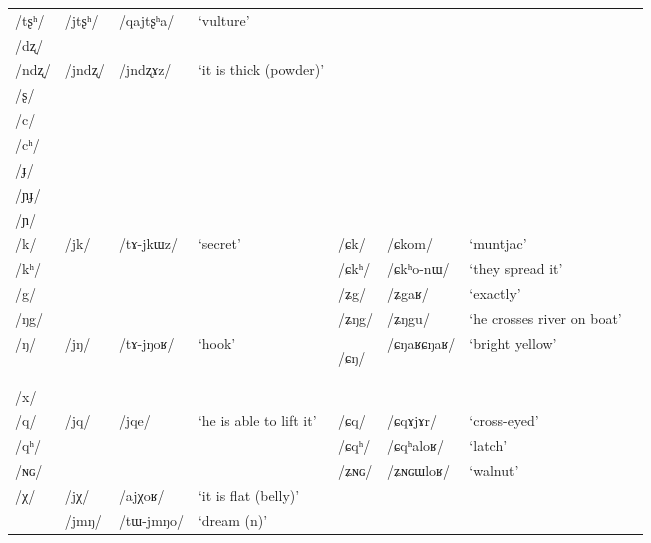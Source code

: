 \documentclass[oneside,a4paper,11pt]{article}
\newcommand{\ipa}[1]{\mbox{\phon/#1/}}
\newcommand{\deux}[1]{\ipa{#1}\addtocounter{2clusters}{1}}
\newcommand{\trois}[1]{\ipa{#1}\addtocounter{3clusters}{1}}
\newcommand{\idph}[1]{\cellcolor{gray}\textbf{#1}}
\newcommand{\resetcounters}[2]{
\newcounter{#1}
\newcounter{#2}
 \setcounter{#1}{\value{2clusters}}
  \setcounter{#2}{\value{3clusters}}
 \setcounter{2clusters}{0}
  \setcounter{3clusters}{0}
}
\begin{document}
\begin{table}
{\begin{tabular}{llllllll}
\ipa{tʂʰ} & \deux{jtʂʰ} & \ipa{qajtʂʰa} & `vulture' & & & & \\
\ipa{dʐ} & & & & & & & \\
\ipa{ndʐ} & \deux{jndʐ} & \ipa{jndʐɤz} & `it is thick (powder)' & & & & \\
\ipa{ʂ} & & & & & & & \\
\ipa{c} & & & & & & & \\
\ipa{cʰ} & & & & & & & \\
\ipa{ɟ} & & & & & & & \\
\ipa{ɲɟ} & & & & & & & \\
\ipa{ɲ} & & & & & & & \\
\ipa{k} & \deux{jk} & \ipa{tɤ-jkɯz} & `secret' & \deux{ɕk} & \ipa{ɕkom} & `muntjac' & \\
\ipa{kʰ} & & & & \deux{ɕkʰ} & \ipa{ɕkʰo-nɯ} & `they spread it' & \\
\ipa{g} & & & & \deux{ʑg} & \ipa{ʑgaʁ} & `exactly' & \\
\ipa{ŋg} & & & & \deux{ʑŋg} & \ipa{ʑŋgu} & `he crosses river on boat' & \\
\ipa{ŋ} & \deux{jŋ} & \ipa{tɤ-jŋoʁ} & `hook' & \deux{ɕŋ} \idph{} & \ipa{ɕŋaʁɕŋaʁ} & `bright yellow' & \\
\ipa{x} & & & & & & & \\
\ipa{q} & \deux{jq} & \ipa{jqe} & `he is able to lift it' & \deux{ɕq} & \ipa{ɕqɤjɤr} & `cross-eyed' & \\
\ipa{qʰ} & & & & \deux{ɕqʰ} & \ipa{ɕqʰaloʁ} & `latch' & \\
\ipa{ɴɢ} & & & & \deux{ʑɴɢ} & \ipa{ʑɴɢɯloʁ} & `walnut' & \\
\ipa{χ} & \deux{jχ} & \ipa{ajχoʁ} & `it is flat (belly)' & & & & \\
\midrule        
 &\trois{jmŋ} & \ipa{tɯ-jmŋo} & `dream (n)' \\  
 \bottomrule
  \end{tabular}}
\end{table}
   \resetcounters{2jcC}{3jcC} %
   
\end{document}

